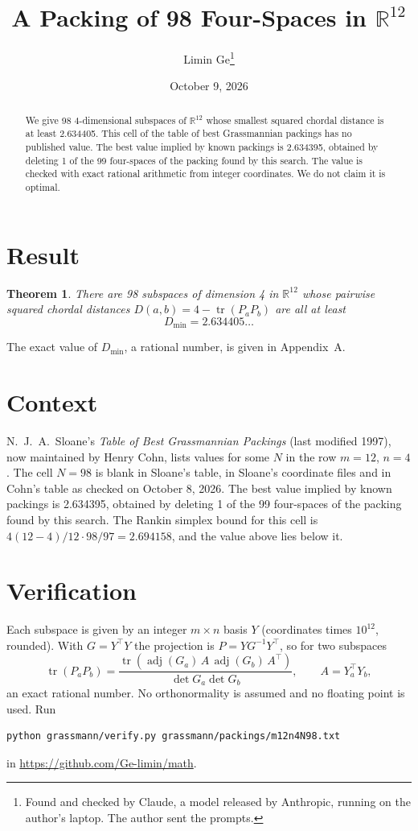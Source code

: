 \documentclass[11pt,a4paper]{article}
\title{A Packing of 98 Four-Spaces in $\mathbb{R}^{12}$}
\author{Limin Ge\thanks{Found and checked by Claude, a model released by Anthropic, running on the author's laptop. The author sent the prompts.}}
\date{October 9, 2026}
\newtheorem*{theorem}{Theorem}
\begin{document}
\maketitle
\begin{abstract}
We give 98 4-dimensional subspaces of $\mathbb{R}^{12}$ whose smallest squared chordal distance is at least 2.634405. This cell of the table of best Grassmannian packings has no published value. The best value implied by known packings is 2.634395, obtained by deleting 1 of the 99 four-spaces of the packing found by this search. The value is checked with exact rational arithmetic from integer coordinates. We do not claim it is optimal.
\end{abstract}

\section{Result}
\begin{theorem}
There are 98 subspaces of dimension 4 in $\mathbb{R}^{12}$ whose pairwise squared chordal distances $D(a,b) = 4 - \operatorname{tr}(P_aP_b)$ are all at least
\[ D_{\min} = 2.634405\ldots \]
\end{theorem}
The exact value of $D_{\min}$, a rational number, is given in Appendix~A.


\section{Context}
N.~J.~A.~Sloane's \emph{Table of Best Grassmannian Packings} (last modified 1997), now maintained by Henry Cohn, lists values for some $N$ in the row $m=12$, $n=4$. The cell $N=98$ is blank in Sloane's table, in Sloane's coordinate files and in Cohn's table as checked on October 8, 2026. The best value implied by known packings is 2.634395, obtained by deleting 1 of the 99 four-spaces of the packing found by this search. The Rankin simplex bound for this cell is $4(12-4)/12\cdot 98/97 = 2.694158$, and the value above lies below it.


\section{Verification}
Each subspace is given by an integer $m\times n$ basis $Y$ (coordinates times $10^{12}$, rounded). With $G=Y^\top Y$ the projection is $P=YG^{-1}Y^\top$, so for two subspaces
\[ \operatorname{tr}(P_aP_b)=\frac{\operatorname{tr}(\operatorname{adj}(G_a)\,A\,\operatorname{adj}(G_b)\,A^\top)}{\det G_a\det G_b},\qquad A=Y_a^\top Y_b, \]
an exact rational number. No orthonormality is assumed and no floating point is used. Run
\begin{verbatim}
python grassmann/verify.py grassmann/packings/m12n4N98.txt
\end{verbatim}
in \url{https://github.com/Ge-limin/math}.
\end{document}
